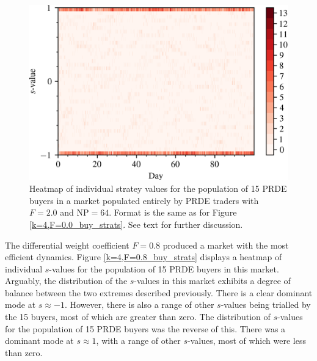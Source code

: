 \documentclass[conference]{IEEEtran}
\begin{document}
\begin{figure}[htbp]
    \centerline{\includegraphics[width=\columnwidth]{k=4,F=2.0_buy_strats.png}}
    \caption{
        Heatmap of individual stratey values for the population of 15 PRDE buyers in a market populated entirely by PRDE traders with $F=2.0$ and $\mathrm{NP}=64$.
        Format is the same as for Figure \ref{k=4,F=0.0_buy_strats}.
        See text for further discussion.
    }
    \label{k=4,F=2.0_buy_strats}
\end{figure}

The differential weight coefficient $F=0.8$ produced a market with the most efficient dynamics.
Figure \ref{k=4,F=0.8_buy_strats} displays a heatmap of individual $s$-values for the population of 15 PRDE buyers in this market.
Arguably, the distribution of the $s$-values in this market exhibits a degree of balance between the two extremes described previously.
There is a clear dominant mode at $s\approx-1$.
However, there is also a range of other $s$-values being trialled by the 15 buyers, most of which are greater than zero.
The distribution of $s$-values for the population of 15 PRDE buyers was the reverse of this.
There was a dominant mode at $s\approx 1$, with a range of other $s$-values, most of which were less than zero.
\end{document}
